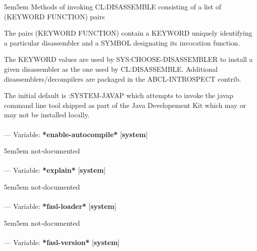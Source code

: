 \begin{adjustwidth}{5em}{5em}
Methods of invoking CL:DISASSEMBLE consisting of a list of (KEYWORD FUNCTION) pairs

The pairs (KEYWORD FUNCTION) contain a KEYWORD uniquely identifying a
particular disassembler and a SYMBOL designating its invocation function.

The KEYWORD values are used by SYS:CHOOSE-DISASSEMBLER to install a
given disassembler as the one used by CL:DISASSEMBLE.  Additional
disassemblers/decompilers are packaged in the ABCL-INTROSPECT contrib.

The initial default is :SYSTEM-JAVAP which attempts to invoke the
javap command line tool shipped as part of the Java Developement Kit
which may or may not be installed locally.

\end{adjustwidth}

\paragraph{}
\label{SYSTEM:*ENABLE-AUTOCOMPILE*}
--- Variable: \textbf{*enable-autocompile*} [\textbf{system}] \textit{}

\begin{adjustwidth}{5em}{5em}
not-documented
\end{adjustwidth}

\paragraph{}
\label{SYSTEM:*EXPLAIN*}
--- Variable: \textbf{*explain*} [\textbf{system}] \textit{}

\begin{adjustwidth}{5em}{5em}
not-documented
\end{adjustwidth}

\paragraph{}
\label{SYSTEM:*FASL-LOADER*}
--- Variable: \textbf{*fasl-loader*} [\textbf{system}] \textit{}

\begin{adjustwidth}{5em}{5em}
not-documented
\end{adjustwidth}

\paragraph{}
\label{SYSTEM:*FASL-VERSION*}
--- Variable: \textbf{*fasl-version*} [\textbf{system}] \textit{}

